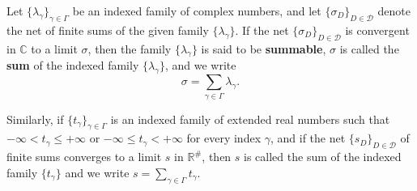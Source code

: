 Let $\{\lambda_\gamma\}_{\gamma \in \Gamma}$ be an indexed family of complex numbers, and let $\{\sigma_D\}_{D \in \mathcal{D}}$ denote the net of finite sums of the given family $\{\lambda_\gamma\}$. If the net $\{\sigma_D\}_{D \in \mathcal{D}}$ is convergent in $\mathbb{C}$ to a limit $\sigma$, then the family $\{\lambda_\gamma\}$ is said to be \textbf{summable}, $\sigma$ is called the \textbf{sum} of the indexed family $\{\lambda_\gamma\}$, and we write
$$\sigma = \sum_{\gamma \in \Gamma} \lambda_\gamma.$$

Similarly, if $\{t_\gamma\}_{\gamma \in \Gamma}$ is an indexed family of extended real numbers such that $-\infty < t_\gamma \leq +\infty$ or $-\infty \leq t_\gamma < +\infty$ for every index $\gamma$, and if the net $\{s_D\}_{D \in \mathcal{D}}$ of finite sums converges to a limit $s$ in $\mathbb{R}^\#$, then $s$ is called the sum of the indexed family $\{t_\gamma\}$ and we write $s = \sum_{\gamma \in \Gamma} t_\gamma$.
